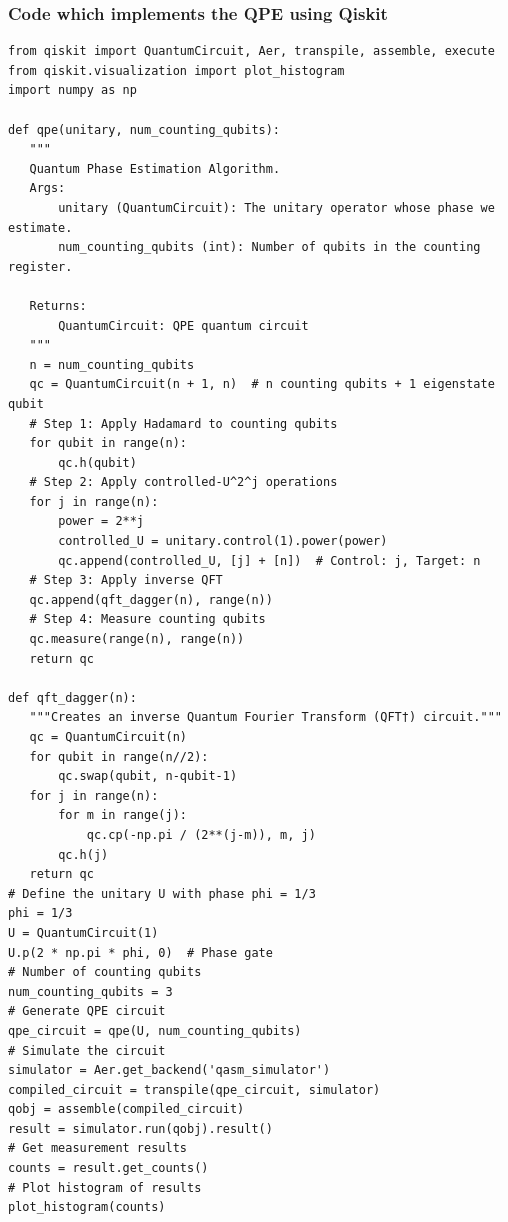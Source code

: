 \documentclass{beamer}
\begin{document}
\begin{frame}
\frametitle{Code which implements the QPE using Qiskit}

\begin{Verbatim}[numbers=none,fontsize=\fontsize{9pt}{9pt},baselinestretch=0.95]
from qiskit import QuantumCircuit, Aer, transpile, assemble, execute
from qiskit.visualization import plot_histogram
import numpy as np

def qpe(unitary, num_counting_qubits):
   """
   Quantum Phase Estimation Algorithm.
   Args:
       unitary (QuantumCircuit): The unitary operator whose phase we estimate.
       num_counting_qubits (int): Number of qubits in the counting register.

   Returns:
       QuantumCircuit: QPE quantum circuit
   """
   n = num_counting_qubits
   qc = QuantumCircuit(n + 1, n)  # n counting qubits + 1 eigenstate qubit
   # Step 1: Apply Hadamard to counting qubits
   for qubit in range(n):
       qc.h(qubit)
   # Step 2: Apply controlled-U^2^j operations
   for j in range(n):
       power = 2**j
       controlled_U = unitary.control(1).power(power)
       qc.append(controlled_U, [j] + [n])  # Control: j, Target: n
   # Step 3: Apply inverse QFT
   qc.append(qft_dagger(n), range(n))
   # Step 4: Measure counting qubits
   qc.measure(range(n), range(n))
   return qc

def qft_dagger(n):
   """Creates an inverse Quantum Fourier Transform (QFT†) circuit."""
   qc = QuantumCircuit(n)
   for qubit in range(n//2):
       qc.swap(qubit, n-qubit-1)
   for j in range(n):
       for m in range(j):
           qc.cp(-np.pi / (2**(j-m)), m, j)
       qc.h(j)
   return qc
# Define the unitary U with phase phi = 1/3
phi = 1/3
U = QuantumCircuit(1)
U.p(2 * np.pi * phi, 0)  # Phase gate
# Number of counting qubits
num_counting_qubits = 3
# Generate QPE circuit
qpe_circuit = qpe(U, num_counting_qubits)
# Simulate the circuit
simulator = Aer.get_backend('qasm_simulator')
compiled_circuit = transpile(qpe_circuit, simulator)
qobj = assemble(compiled_circuit)
result = simulator.run(qobj).result()
# Get measurement results
counts = result.get_counts()
# Plot histogram of results
plot_histogram(counts)

\end{Verbatim}
\end{frame}
\end{document}
